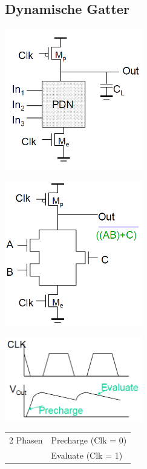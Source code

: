 	\subsection{Dynamische Gatter}
		\begin{multicols}{3}
			\includegraphics[width=6cm]{bilder/cmosDynPrinzip.png}\\
			\columnbreak
			
			\includegraphics[width=6cm]{bilder/cmosDynSchema.png}\\
			\columnbreak
			
			\includegraphics[width=6cm]{bilder/cmosDynSignal.png}\\
			\begin{tabular}{ll}
				2 Phasen & Precharge (Clk = 0)\\
				& Evaluate  (Clk = 1)\\
			\end{tabular}
			\columnbreak
			
		\end{multicols}	
	